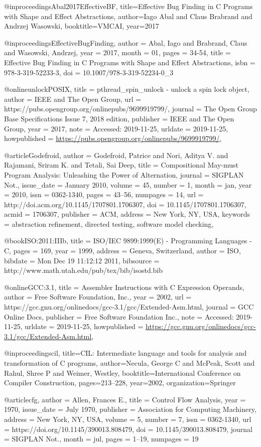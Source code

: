 @inproceedings{Abal2017EffectiveBF,
  title={Effective Bug Finding in C Programs with Shape and Effect Abstractions},
  author={Iago Abal and Claus Brabrand and Andrzej Wasowski},
  booktitle={VMCAI},
  year={2017}
}

@inproceedings{EffectiveBugFinding,
author = {Abal, Iago and Brabrand, Claus and Wasowski, Andrzej},
year = {2017},
month = {01},
pages = {34-54},
title = {Effective Bug Finding in C Programs with Shape and Effect Abstractions},
isbn = {978-3-319-52233-3},
doi = {10.1007/978-3-319-52234-0_3}
}

@online{unlockPOSIX, 
title = {pthread\_spin\_unlock - unlock a spin lock object}, 
author = {IEEE and The Open Group},
url = {https://pubs.opengroup.org/onlinepubs/9699919799/}, 
journal = {The Open Group Base Specifications Issue 7, 2018 edition}, 
publisher = {IEEE and The Open Group}, 
year = 2017,
note = {Accessed: 2019-11-25},
urldate = {2019-11-25},
howpublished = {\url{https://pubs.opengroup.org/onlinepubs/9699919799/}},
}

@article{Godefroid,
 author = {Godefroid, Patrice and Nori, Aditya V. and Rajamani, Sriram K. and Tetali, Sai Deep},
 title = {Compositional May-must Program Analysis: Unleashing the Power of Alternation},
 journal = {SIGPLAN Not.},
 issue_date = {January 2010},
 volume = {45},
 number = {1},
 month = jan,
 year = {2010},
 issn = {0362-1340},
 pages = {43--56},
 numpages = {14},
 url = {http://doi.acm.org/10.1145/1707801.1706307},
 doi = {10.1145/1707801.1706307},
 acmid = {1706307},
 publisher = {ACM},
 address = {New York, NY, USA},
 keywords = {abstraction refinement, directed testing, software model checking},
} 

@book{ISO:2011:IIIb,
  title = {ISO/IEC 9899:1999(E) - Programming Languages - C},
  pages = {169},
  year = {1999},
  address = {Geneva, Switzerland},
  author = {ISO},
  bibdate = {Mon Dec 19 11:12:12 2011},
  bibsource = {http://www.math.utah.edu/pub/tex/bib/isostd.bib}
}

@online{GCC:3.1, 
title = {Assembler Instructions with C Expression Operands}, 
author = {Free Software Foundation, Inc.},
year = 2002,
url = {https://gcc.gnu.org/onlinedocs/gcc-3.1/gcc/Extended-Asm.html}, 
journal = {GCC Online Docs}, 
publisher = {Free Software Foundation Inc.}, 
note = {Accessed: 2019-11-25},
urldate = {2019-11-25},
howpublished = {\url{https://gcc.gnu.org/onlinedocs/gcc-3.1/gcc/Extended-Asm.html}},
}

@inproceedings{cil,
  title={CIL: Intermediate language and tools for analysis and transformation of C programs},
  author={Necula, George C and McPeak, Scott and Rahul, Shree P and Weimer, Westley},
  booktitle={International Conference on Compiler Construction},
  pages={213--228},
  year={2002},
  organization={Springer}
}

@article{cfg, author = {Allen, Frances E.},
title = {Control Flow Analysis},
year = {1970},
issue_date = {July 1970},
publisher = {Association for Computing Machinery},
address = {New York, NY, USA},
volume = {5},
number = {7},
issn = {0362-1340},
url = {https://doi.org/10.1145/390013.808479},
doi = {10.1145/390013.808479},
journal = {SIGPLAN Not.},
month = jul,
pages = {1–19},
numpages = {19} 
}